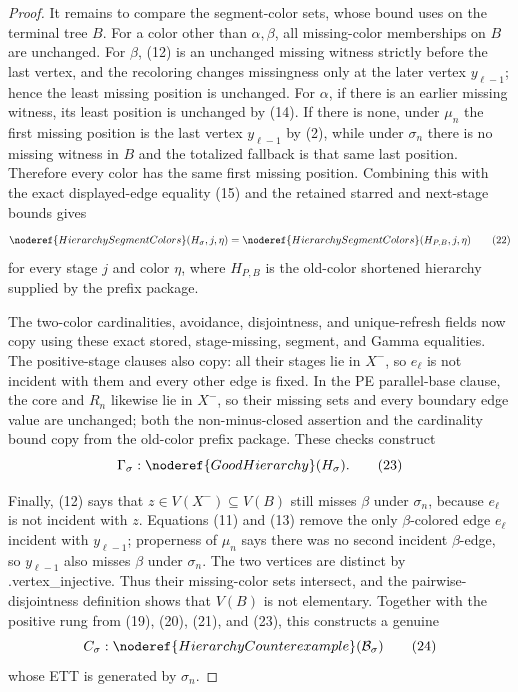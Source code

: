 \begin{proof}
It remains to compare the segment-color sets, whose bound uses
 on the terminal tree \(B\).
For a color other than \(\alpha,\beta\), all missing-color memberships on
\(B\) are unchanged.  For \(\beta\), (12) is an unchanged missing witness
strictly before the last vertex, and the recoloring changes missingness only
at the later vertex \(y_{\ell-1}\); hence the least missing position is
unchanged.  For \(\alpha\), if there is an earlier missing witness, its
least position is unchanged by (14).  If there is none, under \(\mu_n\)
the first missing position is the last vertex \(y_{\ell-1}\) by (2), while
under \(\sigma_n\) there is no missing witness in \(B\) and the totalized
fallback is that same last position.  Therefore every color has the same
first missing position.  Combining this with the exact displayed-edge
equality (15) and the retained starred and next-stage bounds gives
\[
 \noderef{HierarchySegmentColors}(H_\sigma,j,\eta)
   =\noderef{HierarchySegmentColors}(H_{P,B},j,\eta)           \tag{22}
\]
for every stage \(j\) and color \(\eta\), where \(H_{P,B}\) is the
old-color shortened hierarchy supplied by the prefix package.

The two-color cardinalities, avoidance, disjointness, and unique-refresh
fields now copy using these exact stored, stage-missing, segment, and Gamma
equalities.  The positive-stage
 clauses also copy: all their stages lie
in \(X^-\), so \(e_\ell\) is not incident with them and every other edge is
fixed.  In the PE parallel-base clause, the core and \(R_n\) likewise lie
in \(X^-\), so their missing sets and every boundary edge value are
unchanged; both the non-minus-closed assertion and the cardinality bound
copy from the old-color prefix package.  These checks construct
\[
                         \Gamma_\sigma:
                         \noderef{GoodHierarchy}(H_\sigma).   \tag{23}
\]

Finally, (12) says that \(z\in V(X^-)\subseteq V(B)\) still misses
\(\beta\) under \(\sigma_n\), because \(e_\ell\) is not incident with
\(z\).  Equations (11) and (13) remove the only \(\beta\)-colored edge
\(e_\ell\) incident with \(y_{\ell-1}\); properness of \(\mu_n\) says
there was no second incident \(\beta\)-edge, so \(y_{\ell-1}\) also misses
\(\beta\) under \(\sigma_n\).  The two vertices are distinct by
.vertex_injective.  Thus their missing-color sets
intersect, and the pairwise-disjointness definition
 shows that \(V(B)\) is not elementary.
Together with the positive rung from (19), (20), (21), and (23), this
constructs a genuine
\[
 C_\sigma:\noderef{HierarchyCounterexample}(\mathcal B_\sigma) \tag{24}
\]
whose ETT is generated by \(\sigma_n\).


\end{proof}
